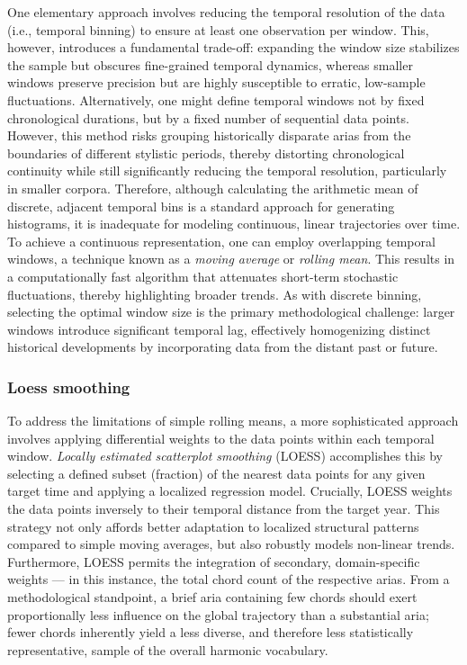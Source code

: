 \documentclass[10pt,a4paper,twocolumn]{article}
\begin{document}
One elementary approach involves reducing the temporal resolution of the data (i.e., temporal binning) to ensure at least one observation per window. This, however, introduces a fundamental trade-off: expanding the window size stabilizes the sample but obscures fine-grained temporal dynamics, whereas smaller windows preserve precision but are highly susceptible to erratic, low-sample fluctuations. Alternatively, one might define temporal windows not by fixed chronological durations, but by a fixed number of sequential data points. However, this method risks grouping historically disparate arias from the boundaries of different stylistic periods, thereby distorting chronological continuity while still significantly reducing the temporal resolution, particularly in smaller corpora. Therefore, although calculating the arithmetic mean of discrete, adjacent temporal bins is a standard approach for generating histograms, it is inadequate for modeling continuous, linear trajectories over time. 
To achieve a continuous representation, one can employ overlapping temporal windows, a technique known as a \textit{moving average} or \textit{rolling mean}. This results in a computationally fast algorithm that attenuates short-term stochastic fluctuations, thereby highlighting broader trends. As with discrete binning, selecting the optimal window size is the primary methodological challenge: larger windows introduce significant temporal lag, effectively homogenizing distinct historical developments by incorporating data from the distant past or future.

\subsubsection{Loess smoothing}
To address the limitations of simple rolling means, a more sophisticated approach involves applying differential weights to the data points within each temporal window. \textit{Locally estimated scatterplot smoothing} (LOESS) accomplishes this by selecting a defined subset (fraction) of the nearest data points for any given target time and applying a localized regression model. Crucially, LOESS weights the data points inversely to their temporal distance from the target year. This strategy not only affords better adaptation to localized structural patterns compared to simple moving averages, but also robustly models non-linear trends. Furthermore, LOESS permits the integration of secondary, domain-specific weights --- in this instance, the total chord count of the respective arias. From a methodological standpoint, a brief aria containing few chords should exert proportionally less influence on the global trajectory than a substantial aria; fewer chords inherently yield a less diverse, and therefore less statistically representative, sample of the overall harmonic vocabulary.
\end{document}
